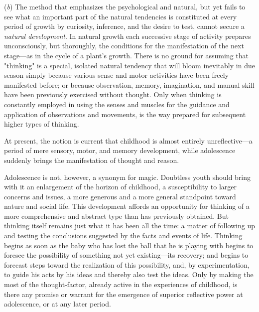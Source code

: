 \documentclass[showtrims,ustradepaper]{memoir}
\begin{document}

(\emph{b}) The method that emphasizes the psychological and natural, but
yet fails to see what an important part of the natural tendencies is
constituted at every period of growth by curiosity, inference, and the
desire to test, cannot secure a \emph{natural development}. In natural
growth each successive stage of activity prepares unconsciously, but
thoroughly, the conditions for the manifestation of the next stage---as
in the cycle of a plant's growth. There is no ground for assuming that
"thinking" is a special, isolated natural tendency that will bloom
inevitably in due season simply because various sense and motor
activities have been freely manifested before; or because observation,
memory, imagination, and manual skill have been previously exercised
without thought. Only when thinking is constantly employed in using the
senses and muscles for the guidance and application of observations and
movements, is the way prepared for subsequent higher types of thinking.


At present, the notion is current that childhood is almost entirely
unreflective---a period of mere sensory, motor, and memory development,
while adolescence suddenly brings the manifestation of thought and
reason.

Adolescence is not, however, a synonym for magic. Doubtless youth should
bring with it an enlargement of the horizon of childhood, a
susceptibility to larger concerns and issues, a more generous and a more
general standpoint toward nature and social life. This development
affords an opportunity for thinking of a more
comprehensive
and abstract type than has previously obtained. But thinking itself
remains just what it has been all the time: a matter of following up and
testing the conclusions suggested by the facts and events of life.
Thinking begins as soon as the baby who has lost the ball that he is
playing with begins to foresee the possibility of something not yet
existing---its recovery; and begins to forecast steps toward the
realization of this possibility, and, by experimentation, to guide his
acts by his ideas and thereby also test the ideas. Only by making the
most of the thought-factor, already active in the experiences of
childhood, is there any promise or warrant for the emergence of superior
reflective power at adolescence, or at any later period.
\end{document}
